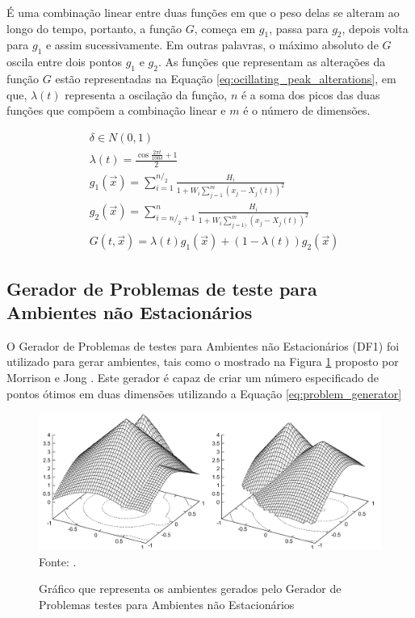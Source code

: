 É uma combinação linear entre duas funções em que o peso delas se alteram ao longo do tempo, portanto, a função $G$, começa em $g_1$, passa para $g_2$, depois volta para $g_1$ e assim sucessivamente. Em outras palavras, o máximo absoluto de $G$ oscila entre dois pontos $g_1$ e $g_2$. As funções que representam as alterações da função $G$ estão representadas na Equação \ref{eq:ocillating_peak_alterations}, em que, $\lambda (t)$ representa a oscilação da função, $n$ é a soma dos picos das duas funções que compõem a combinação linear e $m$ é o número de dimensões.

\begin{equation}
\label{eq:ocillating_peak_alterations}
\begin{split}
& \delta \in N(0,1) \\
& \lambda (t) = \frac{\cos{\frac{2\pi t}{100\delta}} +1}{2} \\
& g_1(\vec{x}) = \sum_{i=1}^{n/_2} \frac{H_i}{1+W_i \sum_{j=1}^{m} (x_j - X_j(t))^2} \\
& g_2(\vec{x}) = \sum_{i=n/_2+1}^{n} \frac{H_i}{1+W_i \sum_{j=1)}^{m} (x_j - X_j(t))^2} \\
& G(t,\vec{x}) = \lambda (t) g_1(\vec{x}) + (1-\lambda (t))g_2(\vec{x})
\end{split}
\end{equation}

\subsection{Gerador de Problemas de teste para Ambientes não Estacionários}
\label{sec:df1_generator}

O Gerador de Problemas de testes para Ambientes não Estacionários (DF1) foi utilizado para gerar ambientes, tais como o mostrado na Figura \ref{fig:problem_generator} proposto por Morrison e Jong \cite{morrison1999test}. Este gerador é capaz de criar um número especificado de pontos ótimos em duas dimensões utilizando a Equação \ref{eq:problem_generator} 

\begin{figure}[!htb]
	\caption{Gráfico que representa os ambientes gerados pelo Gerador de Problemas testes para Ambientes não Estacionários}
	\centering
	\includegraphics[scale=0.31]{images/bm_generator.png}
	\label{fig:problem_generator}{\\Fonte: .}
\end{figure}

